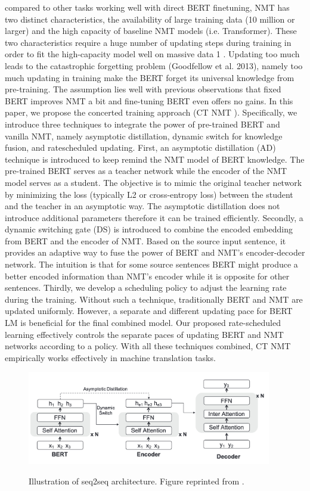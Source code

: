 \cite{yang2020towards}

compared to other tasks working well with direct BERT finetuning, NMT has two distinct characteristics, the availability of large training data (10 million or larger) and the high capacity of baseline NMT models (i.e. Transformer). These two characteristics require a huge number of updating steps during training in order to fit the high-capacity model well on massive data 1 . Updating too much leads to the catastrophic forgetting problem (Goodfellow et al. 2013), namely too much updating in training make the BERT forget its universal knowledge from pre-training. The assumption lies well with previous observations that fixed BERT improves NMT a bit and fine-tuning BERT even offers no gains. In this paper, we propose the concerted training approach (CT NMT ). Specifically, we introduce three techniques to integrate the power of pre-trained BERT and vanilla NMT, namely asymptotic distillation, dynamic switch for knowledge fusion, and ratescheduled updating. First, an asymptotic distillation (AD) technique is introduced to keep remind the NMT model of BERT knowledge. The pre-trained BERT serves as a teacher network while the encoder of the NMT model serves as a student. The objective is to mimic the original teacher network by minimizing the loss (typically L2 or cross-entropy loss) between the student and the teacher in an asymptotic way. The asymptotic distillation does not introduce additional parameters therefore it can be trained efficiently. Secondly, a dynamic switching gate (DS) is introduced to combine the encoded embedding from BERT and the encoder of NMT. Based on the source input sentence, it provides an adaptive way to fuse the power of BERT and NMT's encoder-decoder network. The intuition is that for some source sentences BERT might produce a better encoded information than NMT's encoder while it is opposite for other sentences. Thirdly, we develop a scheduling policy to adjust the learning rate during the training. Without such a technique, traditionally BERT and NMT are updated uniformly.  However, a separate and different updating pace for BERT LM is beneficial for the final combined model. Our proposed rate-scheduled learning effectively controls the separate paces of updating BERT and NMT networks according to a policy. With all these techniques combined, CT NMT empirically works effectively in machine translation tasks.

\begin{figure}[h]
    {\includegraphics[width=0.95\textwidth]{img/ctnmt.png}}
    \centering
    \caption{Illustration of seq2seq architecture. Figure reprinted from \cite{yang2020towards}.}
    \label{img:ctnmt}
\end{figure}

